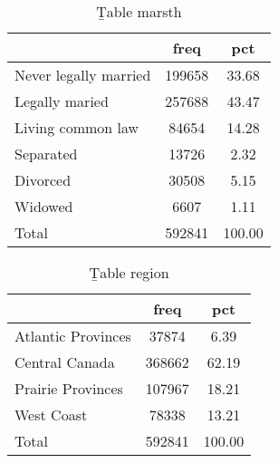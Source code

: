 \begin{table}[htbp]\centering
\def\sym#1{\ifmmode^{#1}\else\(^{#1}\)\fi}
\caption{{\b Table marsth}}
\begin{tabular}{l*{1}{cc}}
\hline\hline
                              &        freq&         pct\\
\hline
Never legally married         &      199658&       33.68\\
Legally maried                &      257688&       43.47\\
Living common law             &       84654&       14.28\\
Separated                     &       13726&        2.32\\
Divorced                      &       30508&        5.15\\
Widowed                       &        6607&        1.11\\
Total                         &      592841&      100.00\\
\hline\hline
\end{tabular}
\end{table}
\begin{table}[htbp]\centering
\def\sym#1{\ifmmode^{#1}\else\(^{#1}\)\fi}
\caption{{\b Table region}}
\begin{tabular}{l*{1}{cc}}
\hline\hline
                              &        freq&         pct\\
\hline
Atlantic Provinces            &       37874&        6.39\\
Central Canada                &      368662&       62.19\\
Prairie Provinces             &      107967&       18.21\\
West Coast                    &       78338&       13.21\\
Total                         &      592841&      100.00\\
\hline\hline
\end{tabular}
\end{table}
